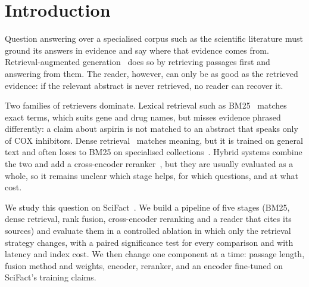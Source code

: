 \documentclass[runningheads]{llncs}
\begin{document}
\section{Introduction}
\label{sec:intro}


Question answering over a specialised corpus such as the scientific literature
must ground its answers in evidence and say where that evidence comes from.
Retrieval-augmented generation~\cite{lewis2020rag} does so by retrieving passages
first and answering from them. The reader, however, can only be as good as the
retrieved evidence: if the relevant abstract is never retrieved, no reader can
recover it.

Two families of retrievers dominate. Lexical retrieval such as
BM25~\cite{robertson2009bm25} matches exact terms, which suits gene and drug
names, but misses evidence phrased differently: a claim about aspirin is not
matched to an abstract that speaks only of COX inhibitors. Dense
retrieval~\cite{karpukhin2020dpr,reimers2019sbert} matches meaning, but it is
trained on general text and often loses to BM25 on specialised
collections~\cite{thakur2021beir}. Hybrid systems combine the two and add a
cross-encoder reranker~\cite{nogueira2019passage}, but they are usually
evaluated as a whole, so it remains unclear which stage helps, for which
questions, and at what cost.

We study this question on SciFact~\cite{wadden2020scifact}. We build a pipeline
of five stages (BM25, dense retrieval, rank fusion, cross-encoder reranking and
a reader that cites its sources) and evaluate them in a controlled ablation in
which only the retrieval strategy changes, with a paired significance test for
every comparison and with latency and index cost. We then change one component
at a time: passage length, fusion method and weights, encoder, reranker, and an
encoder fine-tuned on SciFact's training claims.
\end{document}
